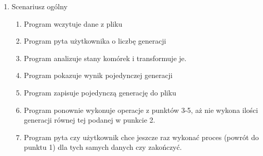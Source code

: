 \documentclass[11pt]{article}
\begin{document}
\begin{enumerate}
\begin{enumerate}[label=\arabic{enumi}.\arabic*.]
\item Scenariusz ogólny
\begin{enumerate}[label*=\arabic*.]
\item Program wczytuje dane z pliku 
\item Program pyta użytkownika o liczbę generacji
\item Program analizuje stany komórek i transformuje je.
\item Program pokazuje wynik pojedynczej generacji
\item Program zapisuje pojedynczą generację do pliku
\item Program ponownie wykonuje operacje z punktów 3-5, aż nie wykona ilości generacji równej tej 		podanej w punkcie 2.
\item Program pyta czy użytkownik chce jeszcze raz wykonać proces (powrót do punktu 1) dla tych 		samych danych czy zakończyć.\\
\end{enumerate}




\end{enumerate}
\end{enumerate}
\end{document}
